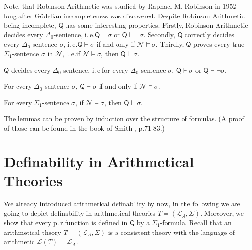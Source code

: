 Note, that Robinson Arithmetic was studied by Raphael M. Robinson in 1952 long after G\"odelian incompleteness was discovered. Despite Robinson Arithmetic being incomplete, $\mathsf{Q}$ has some interesting properties. Firstly, Robinson Arithmetic decides every $\Delta_0$-sentence, i.\,e.\@ $\mathsf{Q} \vdash \sigma$ or $\mathsf{Q} \vdash \lnot \sigma$. Secondly, $\mathsf{Q}$ correctly decides every $\Delta_0$-sentence $\sigma$, i.\,e.\@ $\mathsf{Q} \vdash \sigma$ if and only if $\mathcal{N} \vDash \sigma$. Thirdly, $\mathsf{Q}$ proves every true $\Sigma_1$-sentence $\sigma$ in $\mathcal{N}$, i.\,e.\@ if $\mathcal{N}\vDash \sigma$, then $\mathsf{Q}\vdash \sigma$. 

\begin{lem}
$\mathsf{Q}$ decides every $\Delta_0$-sentence, i.\,e.\@ for every $\Delta_0$-sentence $\sigma$, $\mathsf{Q} \vdash \sigma$ or $\mathsf{Q} \vdash \lnot \sigma$.
\end{lem}

\begin{lem}
For every $\Delta_0$-sentence $\sigma$, $\mathsf{Q} \vdash \sigma$ if and only if $\mathcal{N} \vDash \sigma$.
\end{lem}

\begin{lem}\label{lem:sigma1complete}
For every $\Sigma_1$-sentence $\sigma$, if $\mathcal{N}\vDash \sigma$, then $\mathsf{Q}\vdash \sigma$.
\end{lem}

The lemmas can be proven by induction over the structure of formulas. (A proof of those can be found in the book of Smith \Cite{Smith2009}, p.71-83.)

\section{Definability in Arithmetical Theories}

We already introduced arithmetical definability by now, in the following we are going to depict definability in arithmetical theories $T = (\mathcal{L}_A, \Sigma)$. Moreover, we show that every p.\,r.\@ function is defined in $\mathsf{Q}$ by a $\Sigma_1$-formula. Recall that an arithmetical theory $T = (\mathcal{L}_A, \Sigma)$ is a consistent theory with the language of arithmetic $\mathcal{L}(T) = \mathcal{L}_A$.

